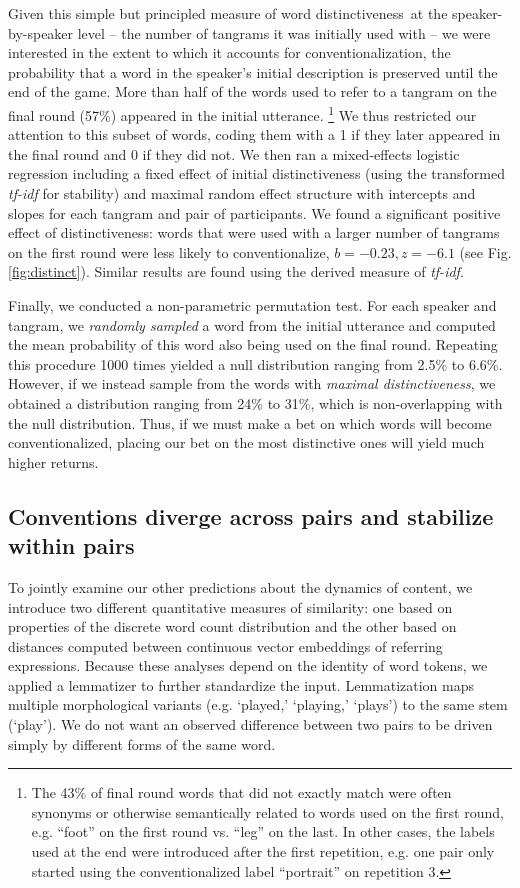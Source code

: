 Given this simple but principled measure of word distinctiveness at the speaker-by-speaker level -- the number of tangrams it was initially used with -- we were interested in the extent to which it accounts for conventionalization, the probability that a word in the speaker's initial description is preserved until the end of the game. 
More than half of the words used to refer to a tangram on the final round (57\%) appeared in the initial utterance. \footnote{The 43\% of final round words that did not exactly match were often synonyms or otherwise semantically related to words used on the first round, e.g. ``foot'' on the first round vs. ``leg'' on the last. In other cases, the labels used at the end were introduced after the first repetition, e.g. one pair only started using the conventionalized label ``portrait'' on repetition 3.}
We thus restricted our attention to this subset of words, coding them with a 1 if they later appeared in the final round and 0 if they did not.
We then ran a mixed-effects logistic regression including a fixed effect of initial distinctiveness (using the transformed \emph{tf-idf} for stability) and maximal random effect structure with intercepts and slopes for each tangram and pair of participants.
We found a significant positive effect of distinctiveness: words that were used with a larger number of tangrams on the first round were less likely to conventionalize, $b = -0.23, z = -6.1$ (see Fig. \ref{fig:distinct}). 
Similar results are found using the derived measure of \emph{tf-idf}.

Finally, we conducted a non-parametric permutation test.
For each speaker and tangram, we \emph{randomly sampled} a word from the initial utterance and computed the mean probability of this word also being used on the final round.
Repeating this procedure 1000 times yielded a null distribution ranging from 2.5\% to 6.6\%.
However, if we instead sample from the words with \emph{maximal distinctiveness}, we obtained a distribution ranging from 24\% to 31\%, which is non-overlapping with the null distribution.
Thus, if we must make a bet on which words will become conventionalized, placing our bet on the most distinctive ones will yield much higher returns.

\subsection{Conventions diverge across pairs and stabilize within pairs}

To jointly examine our other predictions about the dynamics of content, we introduce two different quantitative measures of similarity: one based on properties of the discrete word count distribution and the other based on distances computed between continuous vector embeddings of referring expressions. 
Because these analyses depend on the identity of word tokens, we applied a lemmatizer to further standardize the input.
Lemmatization maps multiple morphological variants (e.g. `played,' `playing,' `plays') to the same stem (`play').
We do not want an observed difference between two pairs to be driven simply by different forms of the same word.

